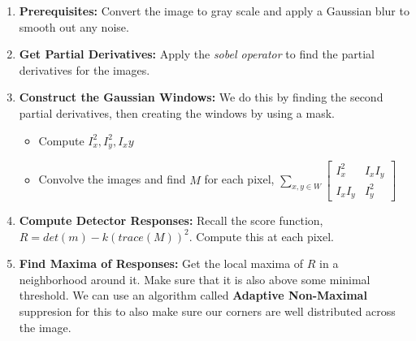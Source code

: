 \documentclass{article}
\begin{document}
\begin{enumerate}
    \item \textbf{Prerequisites:} Convert the image to gray scale and apply a Gaussian blur to smooth out any noise.
    \item \textbf{Get Partial Derivatives:} Apply the \textit{sobel operator} to find the partial derivatives for the images.
    \item \textbf{Construct the Gaussian Windows:} We do this by finding the second partial derivatives, then creating the windows by using a mask.
    \begin{itemize}
        \item Compute $I^2_x,I^2_y, I_xy$
        \item Convolve the images and find $M$ for each pixel, $ \sum_{x,y \in W}\begin{bmatrix}
        I_x^2 & I_xI_y \\
        I_xI_y & I_y^2 
        \end{bmatrix}$
    \end{itemize}
    \item \textbf{Compute Detector Responses:} Recall the score function, $R = det(m) - k(trace(M))^2$. Compute this at each pixel.
    \item \textbf{Find Maxima of Responses:} Get the local maxima of $R$ in a neighborhood around it. Make sure that it is also above some minimal threshold. We can use an algorithm called \textbf{Adaptive Non-Maximal} suppresion for this to also make sure our corners are well distributed across the image. 
\end{enumerate}
\end{document}
